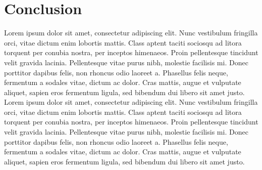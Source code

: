 \documentclass[letterpaper]{article}
\begin{document}
\section{Conclusion}
Lorem ipsum dolor sit amet, consectetur adipiscing elit. Nunc vestibulum fringilla orci, vitae dictum enim lobortis mattis. Class aptent taciti sociosqu ad litora torquent per conubia nostra, per inceptos himenaeos. Proin pellentesque tincidunt velit gravida lacinia. Pellentesque vitae purus nibh, molestie facilisis mi. Donec porttitor dapibus felis, non rhoncus odio laoreet a. Phasellus felis neque, fermentum a sodales vitae, dictum ac dolor. Cras mattis, augue et vulputate aliquet, sapien eros fermentum ligula, sed bibendum dui libero sit amet justo. Lorem ipsum dolor sit amet, consectetur adipiscing elit. Nunc vestibulum fringilla orci, vitae dictum enim lobortis mattis. Class aptent taciti sociosqu ad litora torquent per conubia nostra, per inceptos himenaeos. Proin pellentesque tincidunt velit gravida lacinia. Pellentesque vitae purus nibh, molestie facilisis mi. Donec porttitor dapibus felis, non rhoncus odio laoreet a. Phasellus felis neque, fermentum a sodales vitae, dictum ac dolor. Cras mattis, augue et vulputate aliquet, sapien eros fermentum ligula, sed bibendum dui libero sit amet justo.
\end{document}
